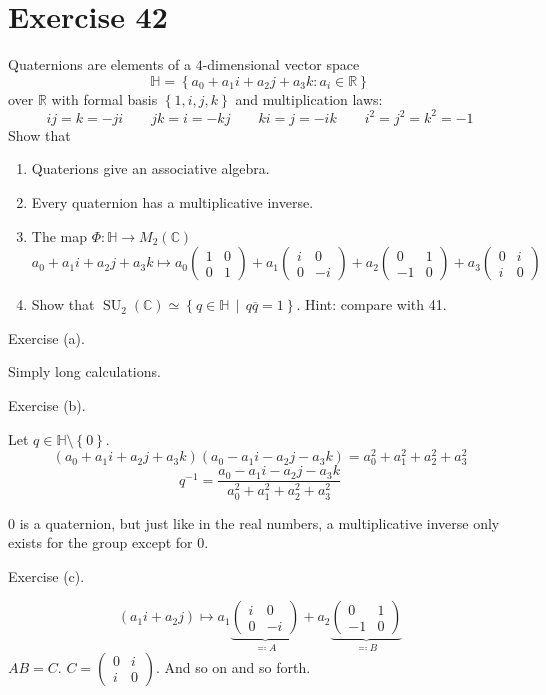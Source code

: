 \documentclass[a4paper]{article}
\theoremstyle{definition}
\newcommand\set[1]{\left\{#1\right\}}
\newcommand\setdef[2]{\left\{#1\,\middle|\,#2\right\}}
\begin{document}
\section*{Exercise 42}
\begin{ex}
  Quaternions are elements of a $4$-dimensional vector space
  \[ \mathbb H = \set{a_0 + a_1 i + a_2 j + a_3 k: a_i \in \mathbb R} \]
  over $\mathbb R$ with formal basis $\set{1,i,j,k}$ and multiplication laws:
  \[ ij = k = -ji \qquad jk = i = -kj \qquad ki = j =-ik \qquad i^2 = j^2 = k^2 = -1 \]
  Show that
  \begin{enumerate}
    \item Quaterions give an associative algebra.
    \item Every quaternion has a multiplicative inverse.
    \item The map $\Phi: \mathbb H \to M_2(\mathbb C)$
      \[ a_0 + a_1i + a_2j + a_3k \mapsto a_0 \begin{pmatrix} 1 & 0 \\ 0 & 1 \end{pmatrix} + a_1 \begin{pmatrix} i & 0 \\ 0 & -i \end{pmatrix} + a_2 \begin{pmatrix} 0 & 1 \\ -1 & 0 \end{pmatrix} + a_3 \begin{pmatrix} 0 & i \\ i & 0 \end{pmatrix} \]
    \item Show that $\operatorname{SU}_2(\mathbb C) \simeq \setdef{q \in \mathbb H}{q\overline q = 1}$. Hint: compare with 41.
  \end{enumerate}
\end{ex}

Exercise (a).

Simply long calculations.

Exercise (b).

Let $q \in \mathbb H \setminus \set{0}$.
\[ (a_0 + a_1 i + a_2 j + a_3 k)(a_0 - a_1 i - a_2 j - a_3 k) = a_0^2 + a_1^2 + a_2^2 + a_3^2 \]
\[ q^{-1} = \frac{a_0 - a_1 i - a_2 j - a_3 k}{a_0^2 + a_1^2 + a_2^2 + a_3^2} \]

$0$ is a quaternion, but just like in the real numbers, a multiplicative inverse only exists for the group except for $0$.

Exercise (c).

\[ (a_1 i + a_2 j) \mapsto a_1 \underbrace{\begin{pmatrix} i & 0 \\ 0 & -i \end{pmatrix}}_{\eqqcolon A} + a_2 \underbrace{\begin{pmatrix} 0 & 1 \\ -1 & 0 \end{pmatrix}}_{\eqqcolon B} \]
$AB = C$. $C = \begin{pmatrix} 0 & i \\ i & 0 \end{pmatrix}$. And so on and so forth.
\end{document}
